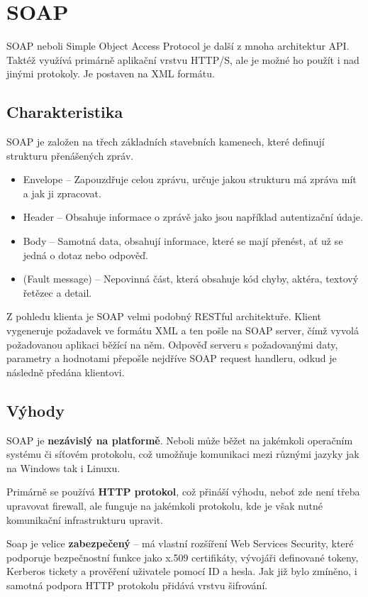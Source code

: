 \section{SOAP}
SOAP neboli Simple Object Access Protocol je další z mnoha architektur API. Taktéž využívá primárně aplikační vrstvu HTTP/S, ale je možné ho použít i nad jinými protokoly. Je postaven na XML formátu.


\subsection{Charakteristika}
SOAP je založen na třech základních stavebních kamenech, které definují strukturu přenášených zpráv.

\begin{itemize}
    \item Envelope -- Zapouzdřuje celou zprávu, určuje jakou strukturu má zpráva mít a jak ji zpracovat.
    \item Header -- Obsahuje informace o zprávě jako jsou například autentizační údaje.
    \item Body -- Samotná data, obsahují informace, které se mají přenést, ať už se jedná o dotaz nebo odpověď.
    \item (Fault message) -- Nepovinná část, která obsahuje kód chyby, aktéra, textový řetězec a detail.
\end{itemize}

Z pohledu klienta je SOAP velmi podobný RESTful architektuře. Klient vygeneruje požadavek ve formátu XML a ten pošle na SOAP server, čímž vyvolá požadovanou aplikaci běžící na něm. Odpověď serveru s požadovanými daty, parametry a hodnotami přepošle nejdříve SOAP request handleru, odkud je následně předána klientovi.

\subsection{Výhody}

SOAP je \textbf{nezávislý na platformě}. Neboli může běžet na jakémkoli operačním systému či síťovém protokolu, což umožňuje komunikaci mezi různými jazyky jak na Windows tak i Linuxu.

Primárně se používá \textbf{HTTP protokol}, což přináší výhodu, neboť zde není třeba upravovat firewall, ale funguje na jakémkoli protokolu, kde je však nutné komunikační infrastrukturu upravit.

Soap je velice \textbf{zabezpečený} -- má vlastní rozšíření Web Services Security, které podporuje bezpečnostní funkce jako x.509 certifikáty, vývojáři definované tokeny, Kerberos tickety a prověření uživatele pomocí ID a hesla. Jak již bylo zmíněno, i samotná podpora HTTP protokolu přidává vrstvu šifrování.

